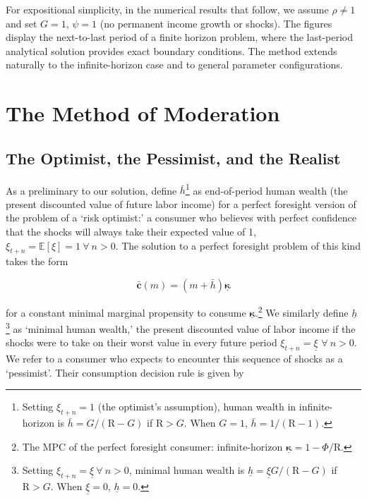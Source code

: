 \documentclass[preprint,authoryear]{elsarticle}
\newcommand{\mNrm}{m}
\newcommand{\CRRA}{\rho}
\newcommand{\Ex}{\mathbf{\mathbb{E}}}
\newcommand{\Rfree}{\text{R}}
\newcommand{\tranShk}{\xi}
\newcommand{\PermGroFac}{G}
\newcommand{\permShk}{\psi}
\newcommand{\AbsPatFac}{\Phi}
\newcommand{\hNrm}{h}
\newcommand{\hNrmOpt}{\bar{\hNrm}}
\newcommand{\cFunc}{\mathbf{c}}
\newcommand{\cFuncOpt}{\bar{\cFunc}}
\newcommand{\MPC}{\boldsymbol{\kappa}}
\newcommand{\MPCmin}{\underline{\MPC}}
\newcommand{\hNrmPes}{\underline{\hNrm}}
\newcommand{\tranShkMin}{\underline{\tranShk}}
\begin{document}
For expositional simplicity, in the numerical results that follow, we assume $\CRRA \neq 1$ and set $\PermGroFac=1$, $\permShk=1$ (no permanent income growth or shocks). The figures display the next-to-last period of a finite horizon problem, where the last-period analytical solution provides exact boundary conditions.  The method extends naturally to the infinite-horizon case and to general parameter configurations.

\section{The Method of Moderation}

\subsection{The Optimist, the Pessimist, and the Realist}

As a preliminary to our solution, define $\hNrmOpt$\footnote{Setting $\tranShk_{t+n}=1$ (the optimist's assumption), human wealth in infinite-horizon is $\hNrmOpt = \PermGroFac/(\Rfree -\PermGroFac)$ if $\Rfree>\PermGroFac$. When $\PermGroFac=1$, $\hNrmOpt = 1/(\Rfree -1)$.} as end-of-period human wealth (the present discounted value of future labor income) for a perfect foresight version of the problem of a `risk optimist:' a consumer who believes with perfect confidence that the shocks will always take their expected value of 1, $\tranShk_{t+n} = \Ex[\tranShk]=1~\forall~n>0$. The solution to a perfect foresight problem of this kind takes the form

\begin{equation}
\label{eq:cFuncOpt}
\cFuncOpt(\mNrm) = (\mNrm + \hNrmOpt)\MPCmin
\end{equation}

for a constant minimal marginal propensity to consume $\MPCmin$.\footnote{The MPC of the perfect foresight consumer: infinite-horizon $\MPCmin=1 -\AbsPatFac/\Rfree$.} We similarly define $\hNrmPes$\footnote{Setting $\tranShk_{t+n}=\tranShkMin~\forall~n>0$, minimal human wealth is $\hNrmPes=\tranShkMin\PermGroFac/(\Rfree -\PermGroFac)$ if $\Rfree>\PermGroFac$. When $\tranShkMin=0$, $\hNrmPes=0$.} as `minimal human wealth,' the present discounted value of labor income if the shocks were to take on their worst value in every future period $\tranShk_{t+n} = \tranShkMin$ $\forall~n>0$.  We refer to a consumer who expects to encounter this sequence of shocks as a `pessimist'. Their consumption decision rule is given by
\end{document}
